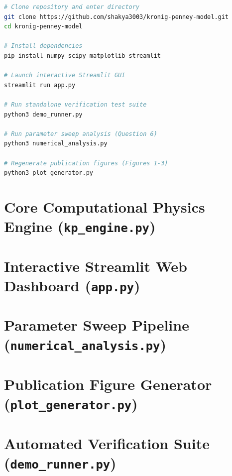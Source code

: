 \documentclass[10pt, a4paper]{article}
\begin{document}
\vspace{10pt}
\begin{lstlisting}[language=bash, caption={Installation and launch commands.}]
# Clone repository and enter directory
git clone https://github.com/shakya3003/kronig-penney-model.git
cd kronig-penney-model

# Install dependencies
pip install numpy scipy matplotlib streamlit

# Launch interactive Streamlit GUI
streamlit run app.py

# Run standalone verification test suite
python3 demo_runner.py

# Run parameter sweep analysis (Question 6)
python3 numerical_analysis.py

# Regenerate publication figures (Figures 1-3)
python3 plot_generator.py
\end{lstlisting}

\clearpage
\section{Core Computational Physics Engine (\texttt{kp\_engine.py})}
\label{app:engine}


\clearpage
\section{Interactive Streamlit Web Dashboard (\texttt{app.py})}
\label{app:app}


\clearpage
\section{Parameter Sweep Pipeline (\texttt{numerical\_analysis.py})}
\label{app:num}


\clearpage
\section{Publication Figure Generator (\texttt{plot\_generator.py})}
\label{app:plot}


\clearpage
\section{Automated Verification Suite (\texttt{demo\_runner.py})}
\label{app:demo}

\end{document}
